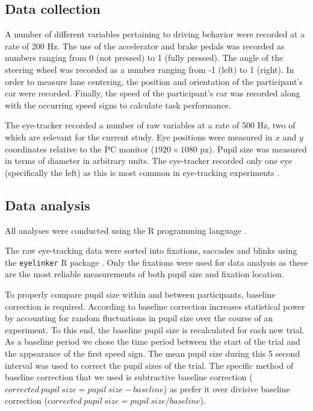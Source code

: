 \subsection{Data collection}
A number of different variables pertaining to driving behavior were recorded at a rate of 200 Hz. 
The use of the accelerator and brake pedals was recorded as numbers ranging from 0 (not pressed) to 1 (fully pressed). 
The angle of the steering wheel was recorded as a number ranging from -1 (left) to 1 (right).
In order to measure lane centering, the position and orientation of the participant's car were recorded. 
Finally, the speed of the participant's car was recorded along with the occurring speed signs to calculate \nback task performance. 

The eye-tracker recorded a number of raw variables at a rate of 500 Hz, two of which are relevant for the current study.
Eye positions were measured in \(x\) and \(y\) coordinates relative to the PC monitor (\(1920 \times 1080\) px).
Pupil size was measured in terms of diameter in arbitrary units.
The eye-tracker recorded only one eye (specifically the left) as this is most common in eye-tracking experiments \citep{Hutton2019}.

\subsection{Data analysis}
All analyses were conducted using the R programming language \citep{R}.

The raw eye-tracking data were sorted into fixations, saccades and blinks using the \texttt{eyelinker} R package \citep{eyelinker}.
Only the fixations were used for data analysis as these are the most reliable measurements of both pupil size and fixation location.

To properly compare pupil size within and between participants, baseline correction is required. 
According to \citet{Mathot2018} baseline correction increases statistical power by accounting for random fluctuations in pupil size over the course of an experiment.
To this end, the baseline pupil size is recalculated for each new trial.
As a baseline period we chose the time period between the start of the trial and the appearance of the first speed sign.
The mean pupil size during this 5 second interval was used to correct the pupil sizes of the trial.
The specific method of baseline correction that we used is subtractive baseline correction (\(corrected\ pupil\ size = pupil\ size - baseline\)) 
as \citet{Mathot2018} prefer it over divisive baseline correction (\(corrected\ pupil\ size = pupil\ size / baseline\)).


